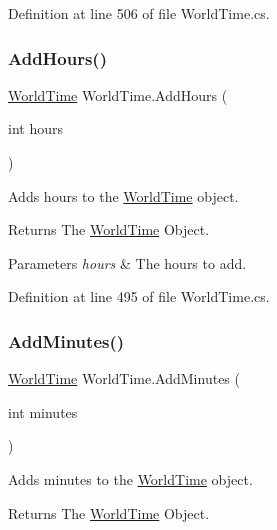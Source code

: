 Definition at line 506 of file World\+Time.\+cs.

\mbox{\label{struct_world_time_a633c5414a483c48a482cb1277b055deb}} 
\subsubsection{\texorpdfstring{Add\+Hours()}{AddHours()}}
{\footnotesize\ttfamily \hyperlink{struct_world_time}{World\+Time} World\+Time.\+Add\+Hours (\begin{DoxyParamCaption}\item[{int}]{hours }\end{DoxyParamCaption})}



Adds hours to the \hyperlink{struct_world_time}{World\+Time} object. 

\begin{DoxyReturn}{Returns}
The \hyperlink{struct_world_time}{World\+Time} Object.
\end{DoxyReturn}

\begin{DoxyParams}{Parameters}
{\em hours} & The hours to add.\\
\hline
\end{DoxyParams}


Definition at line 495 of file World\+Time.\+cs.

\mbox{\label{struct_world_time_a6300271c22e941397c17a076426c1b18}} 
\subsubsection{\texorpdfstring{Add\+Minutes()}{AddMinutes()}}
{\footnotesize\ttfamily \hyperlink{struct_world_time}{World\+Time} World\+Time.\+Add\+Minutes (\begin{DoxyParamCaption}\item[{int}]{minutes }\end{DoxyParamCaption})}



Adds minutes to the \hyperlink{struct_world_time}{World\+Time} object. 

\begin{DoxyReturn}{Returns}
The \hyperlink{struct_world_time}{World\+Time} Object.
\end{DoxyReturn}

